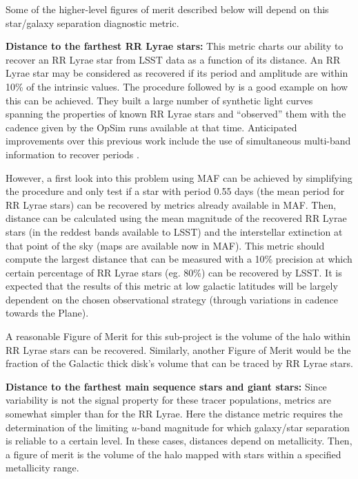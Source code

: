 Some of the higher-level figures of merit described below will depend on this star/galaxy separation diagnostic metric.

\textbf{Distance to the farthest RR Lyrae stars:} This metric charts our ability to
recover an RR Lyrae star from LSST data as a function of its distance. An RR Lyrae star may be
considered as recovered if its period and amplitude are within 10\% of the intrinsic values.
The procedure followed by \citet{2012AJ....144....9O} is a good example on how this can be
achieved. They built a large number of synthetic light curves spanning the properties of
known RR Lyrae stars and ``observed'' them with the cadence given by the OpSim runs
available at that time. Anticipated improvements over this previous work include the use
of simultaneous multi-band information to recover periods \citep[e.g.,][]{vanderplas15,vivas16}.

However, a first look into this problem using MAF can be achieved
by simplifying the procedure and only test if a star with period 0.55 days (the mean period for
RR Lyrae stars) can be recovered by metrics already available in MAF.
Then, distance can be calculated using the mean magnitude of the recovered RR Lyrae stars
(in the reddest bands available to LSST) and the interstellar extinction at that point of the sky (maps are available
now in MAF).  This metric should compute the largest distance that can be measured with a 10\% precision
at which certain percentage of RR
Lyrae stars (eg. 80\%) can be recovered by LSST. It is expected that the results
of this metric at low galactic latitudes will be largely dependent on the chosen observational
strategy (through variations in cadence towards the Plane).

A reasonable Figure of Merit for this sub-project is the volume of the
halo within RR Lyrae stars  can be recovered. Similarly, another Figure
of Merit would be the fraction of the Galactic thick disk's volume that
can be traced by RR Lyrae stars.

\textbf{Distance to the farthest main sequence stars and giant stars:}
Since variability is not the signal property for these tracer
populations, metrics are somewhat simpler than for the RR Lyrae.
Here the distance metric requires the determination of the limiting $u$-band
magnitude
for which galaxy/star separation is reliable to a certain level. In
these cases, distances depend on metallicity. Then, a figure of merit is
the volume of the halo mapped with stars within a specified metallicity
range.

